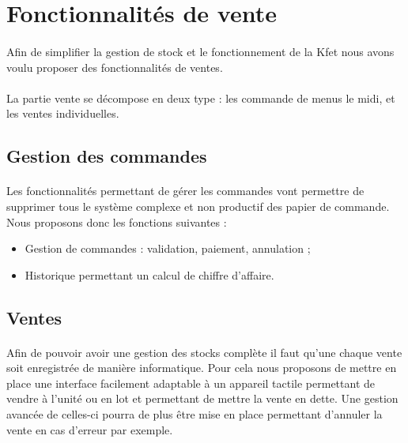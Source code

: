 \documentclass[twoside,UTF8]{EPURapport}
\begin{document}
    \section{Fonctionnalités de vente}
        
        \paragraph{}Afin de simplifier la gestion de stock et le fonctionnement de la Kfet nous avons voulu proposer des fonctionnalités de ventes. 

        \paragraph{}La partie vente se décompose en deux type : les commande de menus le midi, et les ventes individuelles.

        \subsection{Gestion des commandes}
            \paragraph{}Les fonctionnalités permettant de gérer les commandes vont permettre de supprimer tous le système complexe et non productif des papier de commande. Nous proposons donc les fonctions suivantes :
        
            \begin{itemize}
                \item Gestion de commandes : validation, paiement, annulation ;\\                
                \item Historique permettant un calcul de chiffre d'affaire.
            \end{itemize}

        \subsection{Ventes}
            \paragraph{}Afin de pouvoir avoir une gestion des stocks complète il faut qu'une chaque vente soit enregistrée de manière informatique. Pour cela nous proposons de mettre en place une interface facilement adaptable à un appareil tactile permettant de vendre à l'unité ou en lot et permettant de mettre la vente en dette. Une gestion avancée de celles-ci pourra de plus être mise en place permettant d'annuler la vente en cas d'erreur par exemple.
\end{document}
